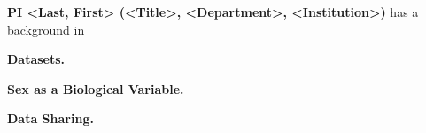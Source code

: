 
\textbf{PI <Last, First> (<Title>, <Department>, <Institution>)} has a background
in %
\lipsum[9]


\textbf{Datasets.}

\textbf{Sex as a Biological Variable.}

\textbf{Data Sharing.}
